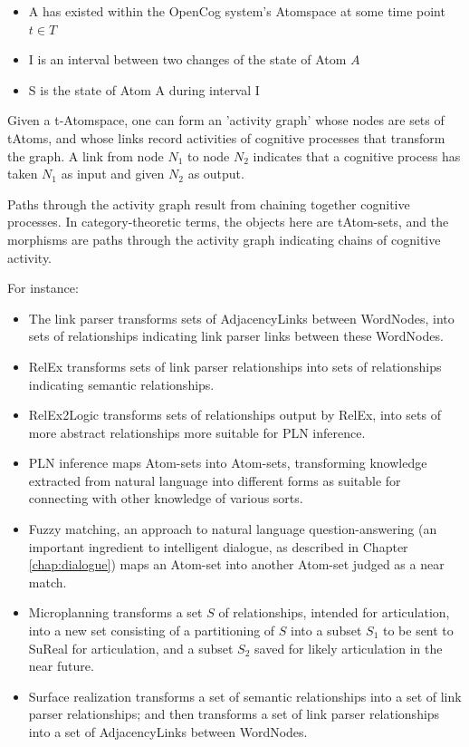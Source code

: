 \begin{itemize}
\item A has existed within the OpenCog system's Atomspace at some time point $t \in T$
\item I is an interval between two changes of the state of Atom $A$
\item S is the state of Atom A during interval I
\end{itemize}

Given a t-Atomspace, one can form an 'activity graph' whose nodes are sets of tAtoms, and whose links record activities of cognitive processes that transform the graph.  A link from node $N_1$ to node $N_2$ indicates that a cognitive process has taken $N_1$ as input and given $N_2$ as output.   

Paths through the activity graph result from chaining together cognitive processes.  In category-theoretic terms, the objects here are tAtom-sets, and the morphisms are paths through the activity graph indicating chains of cognitive activity.

For instance:

\begin{itemize}
\item The link parser transforms sets of AdjacencyLinks between WordNodes, into sets of relationships indicating link parser links between these WordNodes.
\item RelEx transforms sets of link parser relationships into sets of relationships indicating semantic relationships.
\item RelEx2Logic transforms sets of relationships output by RelEx, into sets of more abstract relationships more suitable for PLN inference.
\item PLN inference maps Atom-sets into Atom-sets, transforming knowledge extracted from natural language into different forms as suitable for connecting with other knowledge of various sorts.
\item Fuzzy matching, an approach to natural language question-answering (an important ingredient to intelligent dialogue, as described in Chapter \ref{chap:dialogue}) maps an Atom-set into another Atom-set judged as a near match.
\item Microplanning transforms a set $S$ of relationships, intended for articulation, into a new set consisting of a partitioning of $S$ into a subset $S_1$ to be sent to SuReal for articulation, and a subset $S_2$ saved for likely articulation in the near future.
\item Surface realization transforms a set of semantic relationships into a set of link parser relationships; and then transforms a set of link parser relationships into a set of AdjacencyLinks between WordNodes.
\end{itemize}

